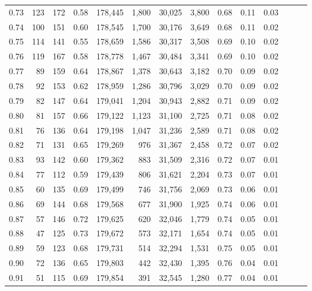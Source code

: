 \begin{tabular}{rrrrrrrrrrrrrr}
0.73 &     123 &  172 &  0.58 &  178,445 &    1,800 &  30,025 &   3,800 &  0.68 &  0.11 &      0.03 \\
0.74 &     100 &  151 &  0.60 &  178,545 &    1,700 &  30,176 &   3,649 &  0.68 &  0.11 &      0.02 \\
0.75 &     114 &  141 &  0.55 &  178,659 &    1,586 &  30,317 &   3,508 &  0.69 &  0.10 &      0.02 \\
0.76 &     119 &  167 &  0.58 &  178,778 &    1,467 &  30,484 &   3,341 &  0.69 &  0.10 &      0.02 \\
0.77 &      89 &  159 &  0.64 &  178,867 &    1,378 &  30,643 &   3,182 &  0.70 &  0.09 &      0.02 \\
0.78 &      92 &  153 &  0.62 &  178,959 &    1,286 &  30,796 &   3,029 &  0.70 &  0.09 &      0.02 \\
0.79 &      82 &  147 &  0.64 &  179,041 &    1,204 &  30,943 &   2,882 &  0.71 &  0.09 &      0.02 \\
0.80 &      81 &  157 &  0.66 &  179,122 &    1,123 &  31,100 &   2,725 &  0.71 &  0.08 &      0.02 \\
0.81 &      76 &  136 &  0.64 &  179,198 &    1,047 &  31,236 &   2,589 &  0.71 &  0.08 &      0.02 \\
0.82 &      71 &  131 &  0.65 &  179,269 &      976 &  31,367 &   2,458 &  0.72 &  0.07 &      0.02 \\
0.83 &      93 &  142 &  0.60 &  179,362 &      883 &  31,509 &   2,316 &  0.72 &  0.07 &      0.01 \\
0.84 &      77 &  112 &  0.59 &  179,439 &      806 &  31,621 &   2,204 &  0.73 &  0.07 &      0.01 \\
0.85 &      60 &  135 &  0.69 &  179,499 &      746 &  31,756 &   2,069 &  0.73 &  0.06 &      0.01 \\
0.86 &      69 &  144 &  0.68 &  179,568 &      677 &  31,900 &   1,925 &  0.74 &  0.06 &      0.01 \\
0.87 &      57 &  146 &  0.72 &  179,625 &      620 &  32,046 &   1,779 &  0.74 &  0.05 &      0.01 \\
0.88 &      47 &  125 &  0.73 &  179,672 &      573 &  32,171 &   1,654 &  0.74 &  0.05 &      0.01 \\
0.89 &      59 &  123 &  0.68 &  179,731 &      514 &  32,294 &   1,531 &  0.75 &  0.05 &      0.01 \\
0.90 &      72 &  136 &  0.65 &  179,803 &      442 &  32,430 &   1,395 &  0.76 &  0.04 &      0.01 \\
0.91 &      51 &  115 &  0.69 &  179,854 &      391 &  32,545 &   1,280 &  0.77 &  0.04 &      0.01 \\

\end{tabular}
